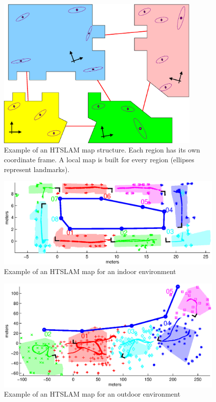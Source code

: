 \begin{figure}
\begin{center}
\includegraphics[width=10cm]{Pics/fig_map_structure}
\end{center}
\caption[Example of an HTSLAM map structure.]
{Example of an HTSLAM map structure. Each region has its own
coordinate frame. A local map is built for every region (ellipses
represent landmarks). }
\label{fig:htslam_structure}
\end{figure}

\begin{figure}
\begin{center}
\includegraphics[width=14cm]{Pics/map_example_indoor}
\end{center}
\caption{Example of an HTSLAM map for an indoor environment}
\label{fig:htslam_structure_indoor}
\end{figure}


\begin{figure}
\includegraphics[width=14cm]{Pics/map_example_outdoor}
\caption{Example of an HTSLAM map for an outdoor environment}
\label{fig:htslam_structure_outdoor}
\end{figure}

